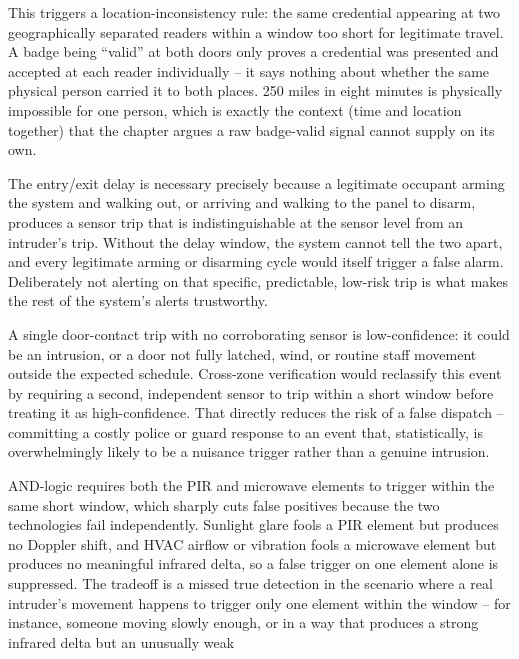 \begin{answerkey}
\item This triggers a location-inconsistency rule: the same credential appearing at two
geographically separated readers within a window too short for legitimate travel. A badge being
``valid'' at both doors only proves a credential was presented and accepted at each reader
individually -- it says nothing about whether the same physical person carried it to both places.
250 miles in eight minutes is physically impossible for one person, which is exactly the
context (time and location together) that the chapter argues a raw badge-valid signal cannot
supply on its own.
\item The entry/exit delay is necessary precisely because a legitimate occupant arming the system
and walking out, or arriving and walking to the panel to disarm, produces a sensor trip that is
indistinguishable at the sensor level from an intruder's trip. Without the delay window, the system
cannot tell the two apart, and every legitimate arming or disarming cycle would itself trigger a
false alarm. Deliberately not alerting on that specific, predictable, low-risk trip is what makes
the rest of the system's alerts trustworthy.
\item A single door-contact trip with no corroborating sensor is low-confidence: it could be an
intrusion, or a door not fully latched, wind, or routine staff movement outside the expected
schedule. Cross-zone verification would reclassify this event by requiring a second, independent
sensor to trip within a short window before treating it as high-confidence. That directly reduces
the risk of a false dispatch -- committing a costly police or guard response to an event that,
statistically, is overwhelmingly likely to be a nuisance trigger rather than a genuine intrusion.
\item AND-logic requires both the PIR and microwave elements to trigger within the same short
window, which sharply cuts false positives because the two technologies fail independently.
Sunlight glare fools a PIR element but produces no Doppler shift, and HVAC airflow or vibration
fools a microwave element but produces no meaningful infrared delta, so a false trigger on one
element alone is suppressed. The tradeoff is a missed true detection in the scenario where a real
intruder's movement happens to trigger only one element within the window -- for instance, someone
moving slowly enough, or in a way that produces a strong infrared delta but an unusually weak

\end{answerkey}
